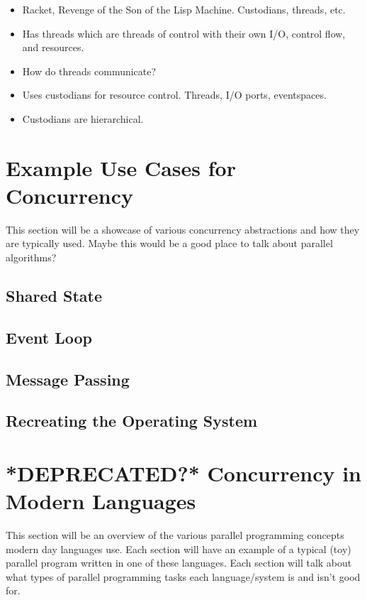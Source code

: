 \documentclass{article}
\begin{document}
\begin{itemize}
  \item Racket, Revenge of the Son of the Lisp Machine. Custodians, threads,
        etc.
  \item Has threads which are threads of control with their own I/O, control
        flow, and resources.
  \item How do threads communicate?
  \item Uses custodians for resource control. Threads, I/O ports, eventspaces.
  \item Custodians are hierarchical.
\end{itemize}

\section{Example Use Cases for Concurrency}

This section will be a showcase of various concurrency abstractions
and how they are typically used. Maybe this would be a good place to
talk about parallel algorithms?

\subsection{Shared State}

\subsection{Event Loop}

\subsection{Message Passing}

\subsection{Recreating the Operating System}

\section{*DEPRECATED?* Concurrency in Modern Languages}
This section will be an overview of the various parallel programming
concepts modern day languages use. Each section will have an example of
a typical (toy) parallel program written in one of these languages. Each
section will talk about what types of parallel programming tasks
each language/system is and isn't good for.
\end{document}
